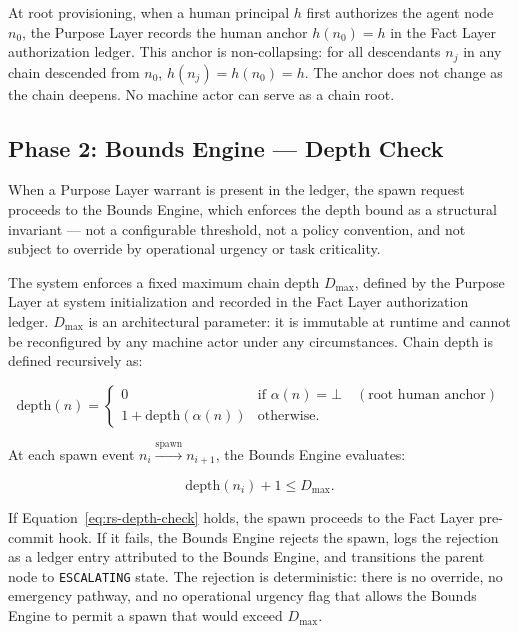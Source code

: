 At root provisioning, when a human principal $h$ first authorizes the agent node $n_0$, the Purpose Layer records the human anchor $h(n_0) = h$ in the Fact Layer authorization ledger. This anchor is non-collapsing: for all descendants $n_j$ in any chain descended from $n_0$, $h(n_j) = h(n_0) = h$. The anchor does not change as the chain deepens. No machine actor can serve as a chain root.

\subsection{Phase 2: Bounds Engine — Depth Check}
\label{sec:rs-phase2}

When a Purpose Layer warrant is present in the ledger, the spawn request proceeds to the Bounds Engine, which enforces the depth bound as a structural invariant — not a configurable threshold, not a policy convention, and not subject to override by operational urgency or task criticality.

The system enforces a fixed maximum chain depth $D_{\max}$, defined by the Purpose Layer at system initialization and recorded in the Fact Layer authorization ledger. $D_{\max}$ is an architectural parameter: it is immutable at runtime and cannot be reconfigured by any machine actor under any circumstances. Chain depth is defined recursively as:

\begin{equation}
\text{depth}(n) =
\begin{cases}
0 & \text{if } \alpha(n) = \bot \quad (\text{root human anchor}) \\[6pt]
1 + \text{depth}(\alpha(n)) & \text{otherwise}.
\end{cases}
\label{eq:rs-depth}
\end{equation}

At each spawn event $n_i \xrightarrow{\text{spawn}} n_{i+1}$, the Bounds Engine evaluates:

\begin{equation}
\text{depth}(n_i) + 1 \leq D_{\max}.
\label{eq:rs-depth-check}
\end{equation}

If Equation~\ref{eq:rs-depth-check} holds, the spawn proceeds to the Fact Layer pre-commit hook. If it fails, the Bounds Engine rejects the spawn, logs the rejection as a ledger entry attributed to the Bounds Engine, and transitions the parent node to \texttt{ESCALATING} state. The rejection is deterministic: there is no override, no emergency pathway, and no operational urgency flag that allows the Bounds Engine to permit a spawn that would exceed $D_{\max}$.

